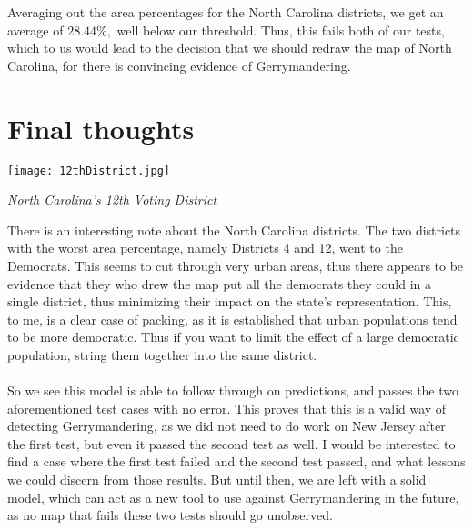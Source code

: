 \documentclass[12pt]{article}
\begin{document}
		\noindent
			Averaging out the area percentages for the North Carolina districts, we get an average of $28.44\%,$ well below our threshold.  Thus, this fails both of our tests, which to us would lead to the decision that we should redraw the map of North Carolina, for there is convincing evidence of Gerrymandering.
	\section{Final thoughts}
	
		\begin{center}
		\texttt{[image: 12thDistrict.jpg]}
		
		\textit{North Carolina's 12th Voting District}
		
		
		
	\end{center}


	\noindent
		There is an interesting note about the North Carolina districts.  The two districts with the worst area percentage, namely Districts 4 and 12, went to the Democrats.  This seems to cut through very urban areas, thus there appears to be evidence that they who drew the map put all the democrats they could in a single district, thus minimizing their impact on the state's representation.  This, to me, is a clear case of packing, as it is established that urban populations tend to be more democratic.\cite{urban}  Thus if you want to limit the effect of a large democratic population, string them together into the same district.
		\\ \\So we see this model is able to follow through on predictions, and passes the two aforementioned test cases with no error.  This proves that this is a valid way of detecting Gerrymandering, as we did not need to do work on New Jersey after the first test, but even it passed the second test as well.  I would be interested to find a case where the first test failed and the second test passed, and what lessons we could discern from those results.  But until then, we are left with a solid model, which can act as a new tool to use against Gerrymandering in the future, as no map that fails these two tests should go unobserved.
		
\end{document}

